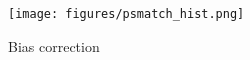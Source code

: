\begin{figure}[H]
    \centering 
    \caption{Bias correction}
    \texttt{[image: figures/psmatch\_hist.png]}
\end{figure}